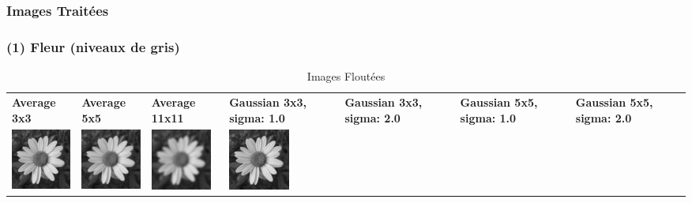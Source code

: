 \subsubsection{Images Traitées}

\subsubsection*{(1) Fleur (niveaux de gris)}

\begin{table}[h!]
    \centering
    \captionsetup{justification=centering}
    \caption*{Images Floutées}
    \begin{tabular}{>{\centering\arraybackslash} m{2cm} >{\centering\arraybackslash} m{2cm} >{\centering\arraybackslash} m{2cm} >{\centering\arraybackslash} m{2cm} >{\centering\arraybackslash} m{2cm} >{\centering\arraybackslash} m{2cm} >{\centering\arraybackslash} m{2cm}}
        \textbf{Average 3x3}                                                                   & \textbf{Average 5x5} & \textbf{Average 11x11} & \textbf{Gaussian 3x3, sigma: 1.0} & \textbf{Gaussian 3x3, sigma: 2.0} & \textbf{Gaussian 5x5, sigma: 1.0} & \textbf{Gaussian 5x5, sigma: 2.0} \\
        \includegraphics[width=2cm]{images/processed/flower/average_3x3/blurred.png}           &
        \includegraphics[width=2cm]{images/processed/flower/average_5x5/blurred.png}           &
        \includegraphics[width=2cm]{images/processed/flower/average_11x11/blurred.png}         &
        \includegraphics[width=2cm]{images/processed/flower/gaussian_3x3_sigma1.0/blurred.png} &

\end{tabular}
\end{table}
